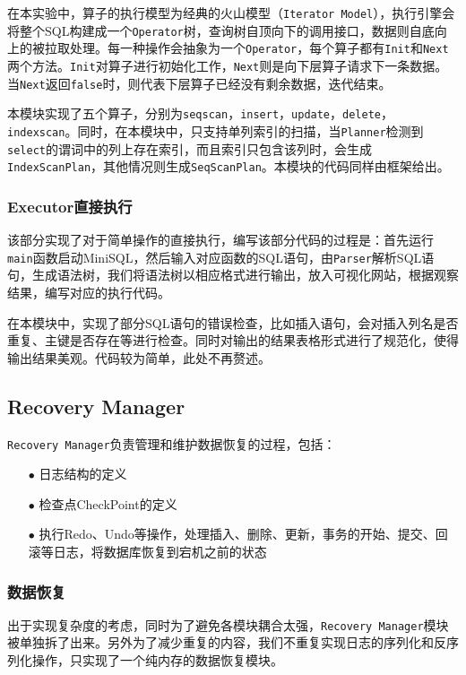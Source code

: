 \documentclass[12pt]{article}
\begin{document}
    在本实验中，算子的执行模型为经典的火山模型（\texttt{Iterator Model}），执行引擎会将整个SQL构建成一个\texttt{Operator}树，查询树自顶向下的调用接口，数据则自底向上的被拉取处理。每一种操作会抽象为一个\texttt{Operator}，每个算子都有\texttt{Init}和\texttt{Next}两个方法。\texttt{Init}对算子进行初始化工作，\texttt{Next}则是向下层算子请求下一条数据。当\texttt{Next}返回\texttt{false}时，则代表下层算子已经没有剩余数据，迭代结束。

    本模块实现了五个算子，分别为\texttt{seqscan}，\texttt{insert}，\texttt{update}，\texttt{delete}，\texttt{indexscan}。同时，在本模块中，只支持单列索引的扫描，当\texttt{Planner}检测到\texttt{select}的谓词中的列上存在索引，而且索引只包含该列时，会生成\texttt{IndexScanPlan}，其他情况则生成\texttt{SeqScanPlan}。本模块的代码同样由框架给出。

    \subsubsection{Executor直接执行}
    该部分实现了对于简单操作的直接执行，编写该部分代码的过程是：首先运行\texttt{main}函数启动MiniSQL，然后输入对应函数的SQL语句，由\texttt{Parser}解析SQL语句，生成语法树，我们将语法树以相应格式进行输出，放入可视化网站，根据观察结果，编写对应的执行代码。

    在本模块中，实现了部分SQL语句的错误检查，比如插入语句，会对插入列名是否重复、主键是否存在等进行检查。同时对输出的结果表格形式进行了规范化，使得输出结果美观。代码较为简单，此处不再赘述。

    \subsection{Recovery Manager}
    \texttt{Recovery Manager}负责管理和维护数据恢复的过程，包括：
    \begin{itemize}
        \item[$\bullet$] 日志结构的定义
        \item[$\bullet$] 检查点CheckPoint的定义
        \item[$\bullet$] 执行Redo、Undo等操作，处理插入、删除、更新，事务的开始、提交、回滚等日志，将数据库恢复到宕机之前的状态
    \end{itemize}

    \subsubsection{数据恢复}
    出于实现复杂度的考虑，同时为了避免各模块耦合太强，\texttt{Recovery Manager}模块被单独拆了出来。另外为了减少重复的内容，我们不重复实现日志的序列化和反序列化操作，只实现了一个纯内存的数据恢复模块。
\end{document}
